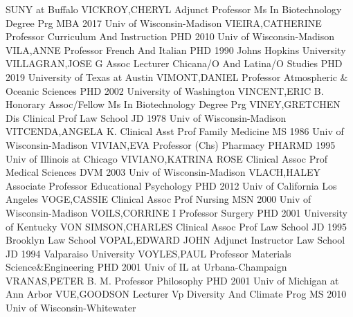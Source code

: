 \documentclass[
]{article}
\begin{document}
SUNY at Buffalo \textbar{}  \textbar VICKROY,CHERYL
\textbar Adjunct Professor \textbar Ms In Biotechnology Degree Prg
\textbar MBA 2017 Univ of Wisconsin-Madison \textbar{} 
\textbar VIEIRA,CATHERINE \textbar Professor \textbar Curriculum And
Instruction \textbar PHD 2010 Univ of Wisconsin-Madison \textbar{}
 \textbar VILA,ANNE \textbar Professor \textbar French And
Italian \textbar PHD 1990 Johns Hopkins University \textbar{}
 \textbar VILLAGRAN,JOSE G \textbar Assoc Lecturer
\textbar Chicana/O And Latina/O Studies \textbar PHD 2019 University of
Texas at Austin \textbar{}  \textbar VIMONT,DANIEL
\textbar Professor \textbar Atmospheric \& Oceanic Sciences \textbar PHD
2002 University of Washington \textbar{} 
\textbar VINCENT,ERIC B. \textbar Honorary Assoc/Fellow \textbar Ms In
Biotechnology Degree Prg \textbar VINEY,GRETCHEN \textbar{} 
\textbar Dis Clinical Prof \textbar Law School \textbar JD 1978 Univ of
Wisconsin-Madison \textbar VITCENDA,ANGELA K. \textbar{} 
\textbar Clinical Asst Prof \textbar Family Medicine \textbar MS 1986
Univ of Wisconsin-Madison \textbar VIVIAN,EVA \textbar{} 
\textbar Professor (Chs) \textbar Pharmacy \textbar PHARMD 1995 Univ of
Illinois at Chicago \textbar VIVIANO,KATRINA ROSE \textbar{}
 \textbar Clinical Assoc Prof \textbar Medical Sciences
\textbar DVM 2003 Univ of Wisconsin-Madison \textbar VLACH,HALEY
\textbar{}  \textbar Associate Professor
\textbar Educational Psychology \textbar PHD 2012 Univ of California Los
Angeles \textbar VOGE,CASSIE \textbar{}  \textbar Clinical
Assoc Prof \textbar Nursing \textbar MSN 2000 Univ of Wisconsin-Madison
\textbar VOILS,CORRINE I \textbar{}  \textbar Professor
\textbar Surgery \textbar PHD 2001 University of Kentucky \textbar VON
SIMSON,CHARLES \textbar{}  \textbar Clinical Assoc Prof
\textbar Law School \textbar JD 1995 Brooklyn Law School
\textbar VOPAL,EDWARD JOHN \textbar{}  \textbar Adjunct
Instructor \textbar Law School \textbar JD 1994 Valparaiso University
\textbar VOYLES,PAUL \textbar{}  \textbar Professor
\textbar Materials Science\&Engineering \textbar PHD 2001 Univ of IL at
Urbana-Champaign \textbar VRANAS,PETER B. M. \textbar{} 
\textbar Professor \textbar Philosophy \textbar PHD 2001 Univ of
Michigan at Ann Arbor \textbar VUE,GOODSON \textbar{} 
\textbar Lecturer \textbar Vp Diversity And Climate Prog \textbar MS
2010 Univ of Wisconsin-Whitewater \textbar{}
\end{document}
